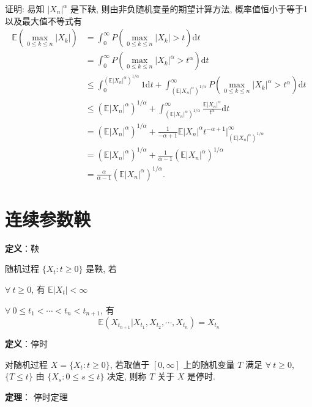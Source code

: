 \documentclass[openany]{ctexbook}
\theoremstyle{kaiti}
\theoremstyle{normal}
\begin{document}
证明: 易知 $|X_n|^\alpha$ 是下鞅, 则由非负随机变量的期望计算方法, 概率值恒小于等于1以及最大值不等式有
\begin{equation}
  \begin{aligned}
    \mathbb{E}\left(\max_{0\leqslant k\leqslant n}|X_k|\right)
    &=\int_0^\infty P\left(\max_{0\leqslant k\leqslant n}|X_k|>t\right)\mathrm{d}t\\
    &=\int_0^\infty P\left(\max_{0\leqslant k\leqslant n}|X_k|^\alpha>t^\alpha\right)\mathrm{d}t\\
    &\leqslant\int_0^{(\mathbb{E}|X_n|^\alpha)^{1/\alpha}}1\mathrm{d}t+\int_{(\mathbb{E}|X_n|^\alpha)^{1/\alpha}}^\infty P\left(\max_{0\leqslant k\leqslant n}|X_k|^\alpha>t^\alpha\right)\mathrm{d}t\\
    &\leqslant(\mathbb{E}|X_n|^\alpha)^{1/\alpha}+\int_{(\mathbb{E}|X_n|^\alpha)^{1/\alpha}}^\infty\frac{\mathbb{E}|X_n|^\alpha}{t^\alpha}\mathrm{d}t\\
    &=(\mathbb{E}|X_n|^\alpha)^{1/\alpha}+\frac{1}{-\alpha+1}\mathbb{E}|X_n|^\alpha t^{-\alpha+1}\Big|_{(\mathbb{E}|X_n|^\alpha)^{1/\alpha}}^\infty\\
    &=(\mathbb{E}|X_n|^\alpha)^{1/\alpha}+\frac{1}{\alpha-1}(\mathbb{E}|X_n|^\alpha)^{1/\alpha}\\
    &=\frac{\alpha}{\alpha-1}(\mathbb{E}|X_n|^\alpha)^{1/\alpha}.
  \end{aligned}
\end{equation}

\section{连续参数鞅}

\textbf{定义}：鞅

随机过程 $\{X_t:t\geqslant0\}$ 是鞅, 若 

$\forall~t\geqslant0$, 有 $\mathbb{E}|X_t|<\infty$

$\forall~0\leqslant  t_1<\cdots< t_n< t_{n+1}$, 有
\begin{equation}
  \mathbb{E}(X_{t_{n+1}}|X_{t_1},X_{t_2},\cdots,X_{t_n})=X_{t_n}
\end{equation}

\textbf{定义}：停时

对随机过程 $X=\{X_t:t\geqslant0\}$, 若取值于 $[0,\infty]$ 上的随机变量 $T$ 满足 $\forall~t\geqslant0$, $\{T\leqslant t\}$ 由 $\{X_s:0\leqslant s\leqslant t\}$ 决定, 则称 $T$ 关于 $X$ 是停时.

\textbf{定理}： 停时定理
\end{document}
